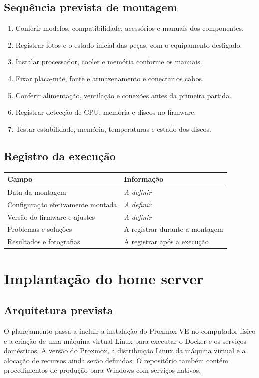 \documentclass[11pt,a4paper,oneside]{report}
\newcommand{\pendente}{\textit{A definir}}
\begin{document}
\section{Sequência prevista de montagem}
\begin{enumerate}
\item Conferir modelos, compatibilidade, acessórios e manuais dos componentes.
\item Registrar fotos e o estado inicial das peças, com o equipamento desligado.
\item Instalar processador, cooler e memória conforme os manuais.
\item Fixar placa-mãe, fonte e armazenamento e conectar os cabos.
\item Conferir alimentação, ventilação e conexões antes da primeira partida.
\item Registrar detecção de CPU, memória e discos no firmware.
\item Testar estabilidade, memória, temperaturas e estado dos discos.
\end{enumerate}

\section{Registro da execução}
\begin{tabularx}{\textwidth}{@{}p{4.4cm}Y@{}}
\toprule
Campo & Informação \\
\midrule
Data da montagem & \pendente \\
Configuração efetivamente montada & \pendente \\
Versão do firmware e ajustes & \pendente \\
Problemas e soluções & A registrar durante a montagem \\
Resultados e fotografias & A registrar após a execução \\
\bottomrule
\end{tabularx}

\chapter{Implantação do home server}
\section{Arquitetura prevista}
O planejamento passa a incluir a instalação do Proxmox VE no computador físico
e a criação de uma máquina virtual Linux para executar o Docker e os serviços
domésticos. A versão do Proxmox, a distribuição Linux da máquina virtual e a
alocação de recursos ainda serão definidas. O repositório também contém
procedimentos de produção para Windows com serviços nativos.
\end{document}
